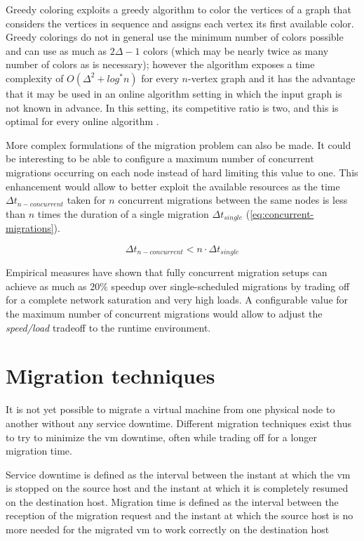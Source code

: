 Greedy coloring exploits a greedy algorithm to color the vertices of a graph that considers the vertices in sequence and assigns each vertex its first available color. Greedy colorings do not in general use the minimum number of colors possible and can use as much as $2\Delta - 1$ colors (which may be nearly twice as many number of colors as is necessary); however the algorithm exposes a time complexity of $O(\Delta^2 + log^{*}n)$ for every $n$-vertex graph \cite{greedy-complexity} and it has the advantage that it may be used in an online algorithm setting in which the input graph is not known in advance. In this setting, its competitive ratio is two, and this is optimal for every online algorithm \cite{greedy}.

More complex formulations of the migration problem can also be made. It could be interesting to be able to configure a maximum number of concurrent migrations occurring on each node instead of hard limiting this value to one. This enhancement would allow to better exploit the available resources as the time ${\Delta}t_{n-concurrent}$ taken for $n$ concurrent migrations between the same nodes is less than $n$ times the duration of a single migration ${\Delta}t_{single}$ (\autoref{eq:concurrent-migrations}).

\begin{equation}
	{\Delta}t_{n-concurrent} < n \cdot {\Delta}t_{single}
	\label{eq:concurrent-migrations}
\end{equation}

Empirical measures have shown that fully concurrent migration setups can achieve as much as $20\%$ speedup over single-scheduled migrations by trading off for a complete network saturation and very high  loads. A configurable value for the maximum number of concurrent migrations would allow to adjust the \emph{speed/load} tradeoff to the runtime environment.


\section{Migration techniques}
\label{sec:migration-techniques}

It is not yet possible to migrate a virtual machine from one physical node to another without any service downtime. Different migration techniques exist thus to try to minimize the \gls{vm} downtime, often while trading off for a longer migration time.

Service downtime is defined as the interval between the instant at which the \gls{vm} is stopped on the source host and the instant at which it is completely resumed on the destination host. Migration time is defined as the interval between the reception of the migration request and the instant at which the source host is no more needed for the migrated \gls{vm} to work correctly on the destination host

